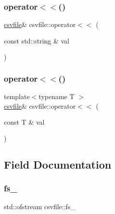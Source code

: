 \mbox{\label{classcsvfile_a3850513edbfe4b488cfd4a5bac2f15e6}} 
\subsubsection{\texorpdfstring{operator$<$$<$()}{operator<<()}\hspace{0.1cm}{\footnotesize\ttfamily [3/4]}}
{\footnotesize\ttfamily \hyperlink{classcsvfile}{csvfile}\& csvfile\+::operator$<$$<$ (\begin{DoxyParamCaption}\item[{const std\+::string \&}]{val }\end{DoxyParamCaption})\hspace{0.3cm}{\ttfamily [inline]}}

\mbox{\label{classcsvfile_ad00150e1310d31fd4f27801e52a3d7a5}} 
\subsubsection{\texorpdfstring{operator$<$$<$()}{operator<<()}\hspace{0.1cm}{\footnotesize\ttfamily [4/4]}}
{\footnotesize\ttfamily template$<$typename T $>$ \\
\hyperlink{classcsvfile}{csvfile}\& csvfile\+::operator$<$$<$ (\begin{DoxyParamCaption}\item[{const T \&}]{val }\end{DoxyParamCaption})\hspace{0.3cm}{\ttfamily [inline]}}



\subsection{Field Documentation}
\mbox{\label{classcsvfile_af9d64cb504548e6bca5e8bf283ae6b00}} 
\subsubsection{\texorpdfstring{fs\+\_\+}{fs\_}}
{\footnotesize\ttfamily std\+::ofstream csvfile\+::fs\+\_\+\hspace{0.3cm}{\ttfamily [private]}}

